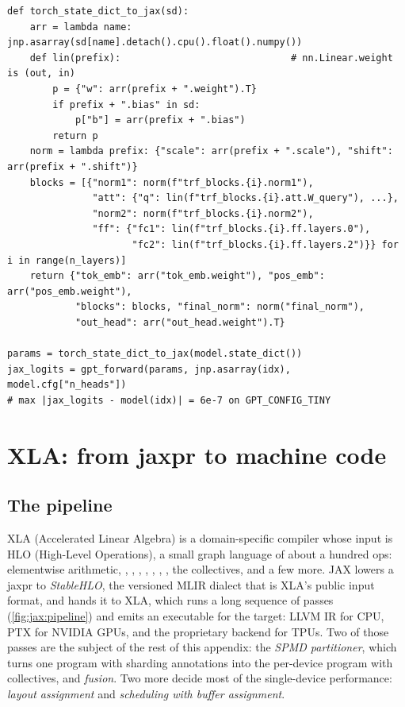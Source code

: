 \begin{lstlisting}[caption={Converting an \code{llmsys.gpt.GPTModel} state\_dict to the pytree of \cref{lst:jax:block} (\code{basics.torch\_state\_dict\_to\_jax}, abridged).},label={lst:jax:bridge}]
def torch_state_dict_to_jax(sd):
    arr = lambda name: jnp.asarray(sd[name].detach().cpu().float().numpy())
    def lin(prefix):                              # nn.Linear.weight is (out, in)
        p = {"w": arr(prefix + ".weight").T}
        if prefix + ".bias" in sd:
            p["b"] = arr(prefix + ".bias")
        return p
    norm = lambda prefix: {"scale": arr(prefix + ".scale"), "shift": arr(prefix + ".shift")}
    blocks = [{"norm1": norm(f"trf_blocks.{i}.norm1"),
               "att": {"q": lin(f"trf_blocks.{i}.att.W_query"), ...},
               "norm2": norm(f"trf_blocks.{i}.norm2"),
               "ff": {"fc1": lin(f"trf_blocks.{i}.ff.layers.0"),
                      "fc2": lin(f"trf_blocks.{i}.ff.layers.2")}} for i in range(n_layers)]
    return {"tok_emb": arr("tok_emb.weight"), "pos_emb": arr("pos_emb.weight"),
            "blocks": blocks, "final_norm": norm("final_norm"),
            "out_head": arr("out_head.weight").T}

params = torch_state_dict_to_jax(model.state_dict())
jax_logits = gpt_forward(params, jnp.asarray(idx), model.cfg["n_heads"])
# max |jax_logits - model(idx)| = 6e-7 on GPT_CONFIG_TINY
\end{lstlisting}

\section{XLA: from jaxpr to machine code}\label{sec:jax:xla}

\subsection{The pipeline}
XLA (Accelerated Linear Algebra) is a domain-specific compiler whose input is HLO
(High-Level Operations), a small graph language of about a hundred ops: elementwise
arithmetic, , , , , ,
, , the collectives, and a few more. JAX lowers a jaxpr to
\emph{StableHLO}, the versioned MLIR dialect that is XLA's public input format, and hands it
to XLA, which runs a long sequence of passes (\cref{fig:jax:pipeline}) and emits an
executable for the target: LLVM IR for CPU, PTX for NVIDIA GPUs, and the proprietary
backend for TPUs. Two of those passes are the subject of the rest of this appendix: the
\emph{SPMD partitioner}, which turns one program with sharding annotations into the
per-device program with collectives, and \emph{fusion}. Two more decide most of the
single-device performance: \emph{layout assignment} and \emph{scheduling with buffer
assignment}.


